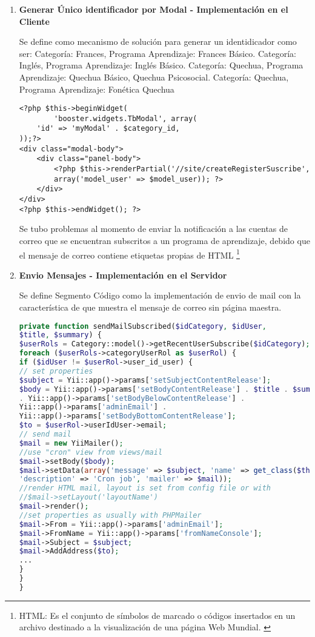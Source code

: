 \begin{enumerate}

\item \textbf{Generar \'{U}nico identificador por Modal - Implementaci\'{o}n en
el Cliente}

Se define como mecanismo de soluci\'{o}n para generar un identidicador como ser:
Categor\'{i}a: Frances, Programa Aprendizaje: Frances B\'{a}sico. Categor\'{i}a:
Ingl\'{e}s, Programa Aprendizaje: Ingl\'{e}s B\'{a}sico. Categor\'{i}a: Quechua,
Programa Aprendizaje: Quechua B\'{a}sico, Quechua Psicosocial. Categor\'{i}a: Quechua,
Programa Aprendizaje: Fon\'{e}tica Quechua

\begin{lstlisting}[]
<?php $this->beginWidget(
        'booster.widgets.TbModal', array(
    'id' => 'myModal' . $category_id,
));?>
<div class="modal-body">
    <div class="panel-body">
        <?php $this->renderPartial('//site/createRegisterSuscribe', 
        array('model_user' => $model_user)); ?>
    </div>
</div>
<?php $this->endWidget(); ?>
\end{lstlisting}

Se tubo problemas al momento de enviar la notificaci\'{o}n a las cuentas de correo
que se encuentran subscritos a un programa de aprendizaje, debido que el mensaje de 
correo contiene etiquetas propias de HTML \footnote{HTML: Es el conjunto de 
s\'{i}mbolos de marcado o c\'{o}digos insertados en un archivo destinado a la
visualizaci\'{o}n de una p\'{a}gina Web Mundial. \cite{html}} 

\item \textbf{Envio Mensajes - Implementaci\'{o}n en el Servidor}

Se define Segmento C\'{o}digo como la implementaci\'{o}n de envio de mail con la 
caracter\'{i}stica de que muestra el mensaje de correo sin p\'{a}gina maestra.

\begin{lstlisting}[language = PHP]
private function sendMailSubscribed($idCategory, $idUser,
$title, $summary) {
$userRols = Category::model()->getRecentUserSubscribe($idCategory);
foreach ($userRols->categoryUserRol as $userRol) {
if ($idUser != $userRol->user_id_user) {
// set properties
$subject = Yii::app()->params['setSubjectContentRelease'];
$body = Yii::app()->params['setBodyContentRelease'] . $title . $summary
. Yii::app()->params['setBodyBelowContentRelease'] . 
Yii::app()->params['adminEmail'] . 
Yii::app()->params['setBodyBottomContentRelease'];
$to = $userRol->userIdUser->email;
// send mail
$mail = new YiiMailer();
//use "cron" view from views/mail
$mail->setBody($body);
$mail->setData(array('message' => $subject, 'name' => get_class($this),
'description' => 'Cron job', 'mailer' => $mail));
//render HTML mail, layout is set from config file or with 
//$mail->setLayout('layoutName')
$mail->render();
//set properties as usually with PHPMailer
$mail->From = Yii::app()->params['adminEmail'];
$mail->FromName = Yii::app()->params['fromNameConsole'];
$mail->Subject = $subject;
$mail->AddAddress($to);
...
}
}
}
\end{lstlisting}

\end{enumerate}

